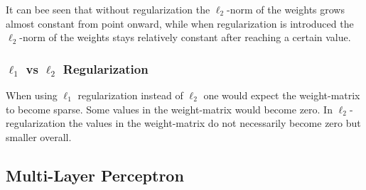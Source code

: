 It can bee seen that without regularization the $\ell_2$-norm of the weights grows almost constant from point onward, while when regularization is introduced the $\ell_2$-norm of the weights stays relatively constant after reaching a certain value.

\subsubsection{$\ell_1$ vs $\ell_2$ Regularization}

When using $\ell_1$ regularization instead of $\ell_2$ one would expect the weight-matrix to become sparse. Some values in the weight-matrix would become zero. In $\ell_2$-regularization the values in the weight-matrix do not necessarily become zero but smaller overall.

\subsection{Multi-Layer Perceptron}